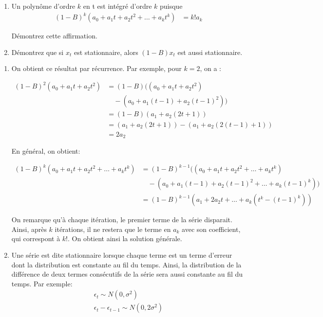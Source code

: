\begin{exercice}
  \begin{enumerate}
\item 
Un polynôme d'ordre $k$ en t est intégré d'ordre $k$ puisque
\begin{align*}
  (1-B)^k(a_0+a_1t+a_2t^2+\ldots+a_kt^k) &= k!a_k 
\end{align*}

Démontrez cette affirmation.
\item 

Démontrez que si $x_t$ est stationnaire, alors $(1-B)x_t$ est aussi stationnaire.
\end{enumerate}

\begin{sol}
\begin{enumerate}

\item On obtient ce résultat par récurrence. Par exemple, pour $k=2$, on a :

\begin{align*}
(1-B)^2 (a_0+a_1t+a_2t^2) &= (1-B) ((a_0+a_1t+a_2t^2)\\ &\quad- (a_0+a_1(t-1)+a_2(t-1)^2)) \\
&= (1-B) (a_1+a_2(2t+1)) \\
&= (a_1+a_2(2t+1)) - (a_1+a_2(2(t-1)+1)) \\
&= 2a_2
\end{align*}

En général, on obtient:

\begin{align*}
(1-B)^k (a_0+a_1t+a_2t^2+\ldots+a_kt^k) &= (1-B)^{k-1} ((a_0+a_1t+a_2t^2+\ldots+a_kt^k)\\ &\quad- (a_0+a_1(t-1)+a_2(t-1)^2+\ldots+a_k(t-1)^k)) \\
&= (1-B)^{k-1} (a_1 + 2a_2t+\ldots+a_k(t^k-(t-1)^k))
\end{align*}

On remarque qu'à chaque itération, le premier terme de la série disparait. Ainsi, après $k$ itérations, il ne restera que le terme en $a_k$ avec son coefficient, qui correspont à $k!$. On obtient ainsi la solution générale.

\item Une série est dite stationnaire lorsque chaque terme est un terme d'erreur dont la distribution est constante au fil du temps. Ainsi, la distribution de la différence de deux termes consécutifs de la série sera aussi constante au fil du temps. Par exemple:
\begin{align*}
\epsilon_t \sim N(0,\sigma^2)  \\
\epsilon_t - \epsilon_{t-1} \sim N(0,2\sigma^2) \\
\end{align*}

\end{enumerate}
\end{sol}
\end{exercice}


